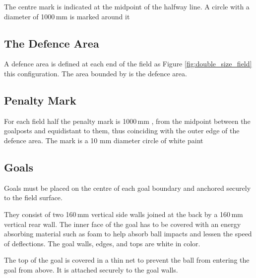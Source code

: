 The centre mark is indicated at the midpoint of the halfway line.
A  circle  with  a  diameter  of 1000\,mm is marked around it 

\subsection{The Defence Area}

A defence area is defined at each end of the field as 
  Figure \ref{fig:double_size_field}  this configuration.
The area bounded by  is
the defence area.


\subsection{Penalty Mark}

For each field half the penalty mark is 1000\,mm , from the midpoint between the goalposts and equidistant to them, thus coinciding with the outer edge of the defence area. The mark is a 10 mm diameter circle of white paint

\subsection{Goals}
Goals must be placed on the centre of each goal boundary and anchored
securely to the field surface.

They consist of two 160\,mm vertical side walls joined at the back by a 160\,mm
vertical rear wall. The inner face of the goal has to be covered with an energy
absorbing material such as foam to help absorb ball impacts and lessen the speed
of deflections.
The goal walls, edges, and tops are white in color.

The top of the goal is covered in a thin net to prevent the ball
from entering the goal from above. It is attached securely to the 
goal walls.

